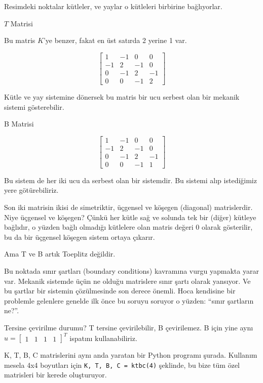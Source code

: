 \documentclass[12pt,fleqn]{article}\usepackage{../../common}
\begin{document}
Resimdeki noktalar kütleler, ve yaylar o kütleleri birbirine bağlıyorlar.

$T$ Matrisi

Bu matris $K$'ye benzer, fakat en üst satırda 2 yerine 1 var. 

$$ 
\left[\begin{array}{rrrr}
1 & -1 & 0 & 0\\
-1 & 2 & -1 & 0\\
0 & -1 & 2 & -1\\
0 & 0 & -1 & 2
\end{array}\right]
$$

Kütle ve yay sistemine dönersek bu matris bir ucu serbest olan bir mekanik
sistemi gösterebilir. 

B Matrisi

$$ 
\left[\begin{array}{rrrr}
1 & -1 & 0 & 0\\
-1 & 2 & -1 & 0\\
0 & -1 & 2 & -1\\
0 & 0 & -1 & 1
\end{array}\right]
$$

Bu sistem de her iki ucu da serbest olan bir sistemdir. Bu sistemi alıp
istediğimiz yere götürebiliriz. 

Son iki matrisin ikisi de simetriktir, üçgensel ve köşegen (diagonal)
matrislerdir. Niye üçgensel ve köşegen? Çünkü her kütle sağ ve solunda
tek bir (diğer) kütleye bağlıdır, o yüzden bağlı olmadığı kütlelere olan
matris değeri 0 olarak gösterilir, bu da bir üçgensel köşegen sistem
ortaya çıkarır.

Ama T ve B artık Toeplitz değildir. 

Bu noktada sınır şartları (boundary conditions) kavramına vurgu yapmakta
yarar var. Mekanik sistemde üçün ne olduğu matrislere sınır şartı olarak
yansıyor. Ve bu şartlar bir sistemin çözülmesinde son derece önemli. Hoca
kendisine bir problemle gelenlere genelde ilk önce bu soruyu soruyor o
yüzden: ``sınır şartların ne?''. 

Tersine çevirilme durumu? T tersine çevirilebilir, B çevirilemez. B için
yine aynı
$u = \left[\begin{array}{cccc} 1 & 1 & 1 & 1 \end{array}\right]^T$ ispatını
kullanabiliriz.

K, T, B, C matrislerini aynı anda yaratan bir Python programı
şurada. Kullanım mesela 4x4 boyutları için \verb!K, T, B, C = ktbc(4)!
şeklinde, bu bize tüm özel matrisleri bir kerede oluşturuyor.
\end{document}
